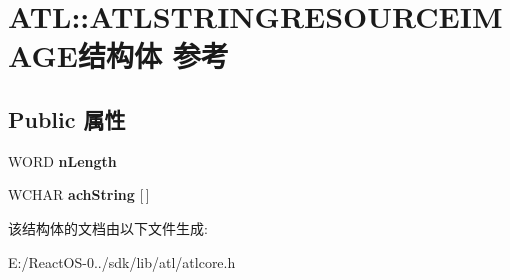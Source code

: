 \hypertarget{struct_a_t_l_1_1_a_t_l_s_t_r_i_n_g_r_e_s_o_u_r_c_e_i_m_a_g_e}{}\section{A\+TL\+:\+:A\+T\+L\+S\+T\+R\+I\+N\+G\+R\+E\+S\+O\+U\+R\+C\+E\+I\+M\+A\+G\+E结构体 参考}
\label{struct_a_t_l_1_1_a_t_l_s_t_r_i_n_g_r_e_s_o_u_r_c_e_i_m_a_g_e}
\subsection*{Public 属性}
\begin{DoxyCompactItemize}
\item 
\mbox{\label{struct_a_t_l_1_1_a_t_l_s_t_r_i_n_g_r_e_s_o_u_r_c_e_i_m_a_g_e_a1e2a4a7e8957dc196d66cb200db743dd}} 
W\+O\+RD {\bfseries n\+Length}
\item 
\mbox{\label{struct_a_t_l_1_1_a_t_l_s_t_r_i_n_g_r_e_s_o_u_r_c_e_i_m_a_g_e_af2e930010a8c0e6f10e2165299f8f2ff}} 
W\+C\+H\+AR {\bfseries ach\+String} \mbox{[}$\,$\mbox{]}
\end{DoxyCompactItemize}


该结构体的文档由以下文件生成\+:\begin{DoxyCompactItemize}
\item 
E\+:/\+React\+O\+S-\/0../sdk/lib/atl/atlcore.\+h\end{DoxyCompactItemize}
